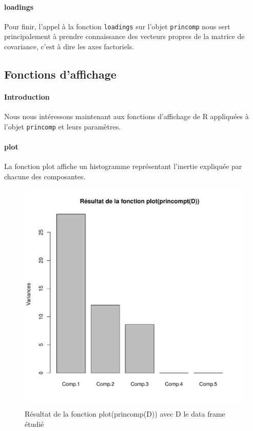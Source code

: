 \documentclass{report}
\begin{document}
\paragraph{loadings}
Pour finir, l'appel à la fonction \verb+loadings+ sur l'objet \verb+princomp+ nous sert principalement à prendre connaissance des vecteurs propres de la matrice de covariance, c'est à dire les axes factoriels.
\subsection{Fonctions d'affichage}
\paragraph{Introduction}
Nous nous intéressons maintenant aux fonctions d'affichage de R appliquées à l'objet \verb+princomp+ et leurs paramètres.
\paragraph{plot}
La fonction plot affiche un histogramme représentant l'inertie expliquée par chacune des composantes.
\begin{figure}[h!]
\begin{center}
    \includegraphics[width=\textwidth]{e4q1.pdf}
    \caption{Résultat de la fonction plot(princomp(D)) avec D le data frame étudié}
\end{center}
\end{figure}
\end{document}
